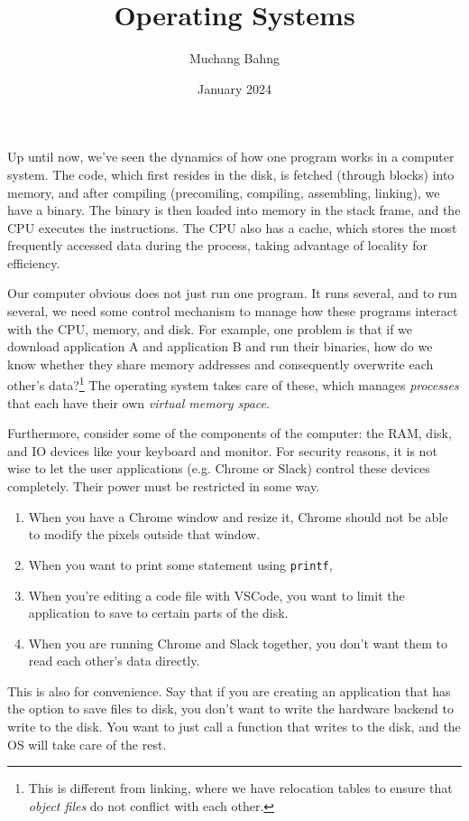 \documentclass{article}
\begin{document}
\title{Operating Systems}
\author{Muchang Bahng}
\date{January 2024}

\maketitle
\tableofcontents
\pagebreak

  Up until now, we've seen the dynamics of how one program works in a computer system. The code, which first resides in the disk, is fetched (through blocks) into memory, and after compiling (precomiling, compiling, assembling, linking), we have a binary. The binary is then loaded into memory in the stack frame, and the CPU executes the instructions. The CPU also has a cache, which stores the most frequently accessed data during the process, taking advantage of locality for efficiency. 

  Our computer obvious does not just run one program. It runs several, and to run several, we need some control mechanism to manage how these programs interact with the CPU, memory, and disk. For example, one problem is that if we download application A and application B and run their binaries, how do we know whether they share memory addresses and consequently overwrite each other's data?\footnote{This is different from linking, where we have relocation tables to ensure that \textit{object files} do not conflict with each other.} The operating system takes care of these, which manages \textit{processes} that each have their own \textit{virtual memory space}. 

  Furthermore, consider some of the components of the computer: the RAM, disk, and IO devices like your keyboard and monitor. For security reasons, it is not wise to let the user applications (e.g. Chrome or Slack) control these devices completely. Their power must be restricted in some way. 
  \begin{enumerate}
    \item When you have a Chrome window and resize it, Chrome should not be able to modify the pixels outside that window. 
    \item When you want to print some statement using \texttt{printf}, 
    \item When you're editing a code file with VSCode, you want to limit the application to save to certain parts of the disk. 
    \item When you are running Chrome and Slack together, you don't want them to read each other's data directly. 
  \end{enumerate}
  This is also for convenience. Say that if you are creating an application that has the option to save files to disk, you don't want to write the hardware backend to write to the disk. You want to just call a function that writes to the disk, and the OS will take care of the rest. 
\end{document}
